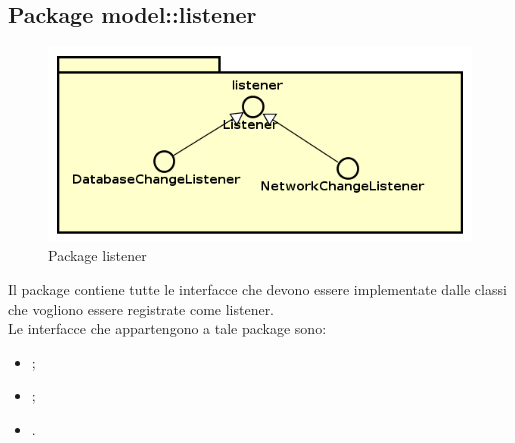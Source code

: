 \documentclass[../Tesi.tex]{subfiles}
\begin{document}
	\subsection{Package model::listener}
		\begin{figure}[H]
			\centering
			\includegraphics[scale=0.6]{images/package_diagrams/listener}
				\caption{Package listener}
		\end{figure}
		Il package  contiene tutte le interfacce che devono essere implementate dalle classi che vogliono essere registrate come listener. \\
		Le interfacce che appartengono a tale package sono:
		\begin{itemize}
			\item {};
			\item {};
			\item {}.
		\end{itemize}
\end{document}
